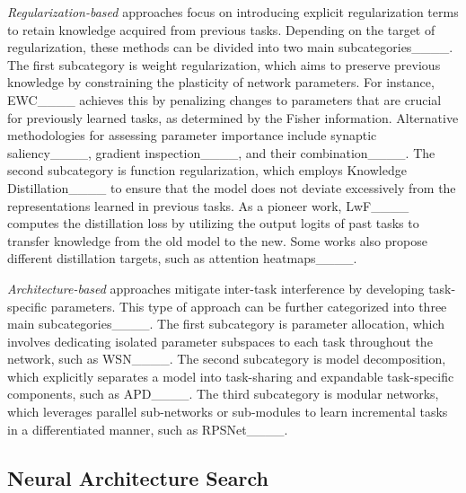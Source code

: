 \textit{Regularization-based} approaches focus on introducing explicit regularization terms to retain knowledge acquired from previous tasks. Depending on the target of regularization, these methods can be divided into two main subcategories____. The first subcategory is weight regularization, which aims to preserve previous knowledge by constraining the plasticity of network parameters. For instance, EWC____ achieves this by penalizing changes to parameters that are crucial for previously learned tasks, as determined by the Fisher information. Alternative methodologies for assessing parameter importance include synaptic saliency____, gradient inspection____, and their combination____. The second subcategory is function regularization, which employs Knowledge Distillation____ to ensure that the model does not deviate excessively from the representations learned in previous tasks. As a pioneer work, LwF____ computes the distillation loss by utilizing the output logits of past tasks to transfer knowledge from the old model to the new. Some works also propose different distillation targets, such as attention heatmaps____. 

\textit{Architecture-based} approaches mitigate inter-task interference by developing task-specific parameters. This type of approach can be further categorized into three main subcategories____. The first subcategory is parameter allocation, which involves dedicating isolated parameter subspaces to each task throughout the network, such as WSN____.  The second subcategory is model decomposition, which explicitly separates a model into task-sharing and expandable task-specific components, such as APD____.  The third subcategory is modular networks, which leverages parallel sub-networks or sub-modules to learn incremental tasks in a differentiated manner, such as RPSNet____. 

\subsection{Neural Architecture Search}

